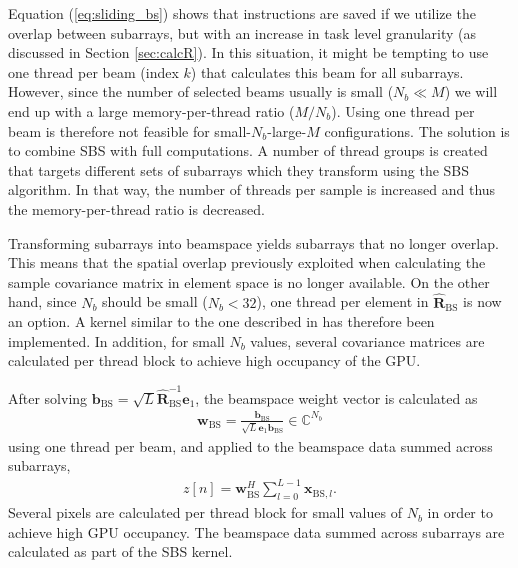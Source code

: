 \documentclass[journal]{IEEEtran}
\newcommand{\mat}[1]{\mathbf{#1}}
\renewcommand{\vec}[1]{\mathbf{#1}}
\begin{document}
Equation (\ref{eq:sliding_bs}) shows that instructions are saved if we utilize the overlap between subarrays, but with an increase in task level granularity (as discussed in Section \ref{sec:calcR}). In this situation, it might be tempting to use one thread per beam (index $k$) that calculates this beam for all subarrays. However, since the number of selected beams usually is small ($N_b \ll M$) we will end up with a large memory-per-thread ratio ($M/N_b$). Using one thread per beam is therefore not feasible for small-$N_b$-large-$M$ configurations. The solution is to combine SBS with full computations. A number of thread groups is created that targets different sets of subarrays which they transform using the SBS algorithm. In that way, the number of threads per sample is increased and thus the memory-per-thread ratio is decreased. 

Transforming subarrays into beamspace yields subarrays that no longer overlap. This means that the spatial overlap previously exploited when calculating the sample covariance matrix in element space is no longer available. On the other hand, since $N_b$ should be small ($N_b < 32$), one thread per element in $\mat{\hat{R}}_\text{BS}$ is now an option. A kernel similar to the one described in \cite{Chen2011} has therefore been implemented. In addition, for small $N_b$ values, several covariance matrices are calculated per thread block to achieve high occupancy of the GPU.

After solving $\vec{b}_\text{BS} = \sqrt{L}\mat{\hat{R}}_\text{BS}^{-1}\vec{e}_1$, the beamspace weight vector is calculated as 
\begin{align}
\vec{w}_\text{BS} = \frac{\vec{b}_\text{BS}}{\sqrt{L}\vec{e}_1\vec{b}_\text{BS}} \in \mathbb{C}^{N_b}
\end{align}  
using one thread per beam, and applied to the beamspace data summed across subarrays,
\begin{align}
z[n] = \vec{w}_\text{BS}^H\sum_{l=0}^{L-1}\vec{x}_{\text{BS},l}. 
\end{align}
Several pixels are calculated per thread block for small values of $N_b$ in order to achieve high GPU occupancy. The beamspace data summed across subarrays are calculated as part of the SBS kernel.   

\end{document}
